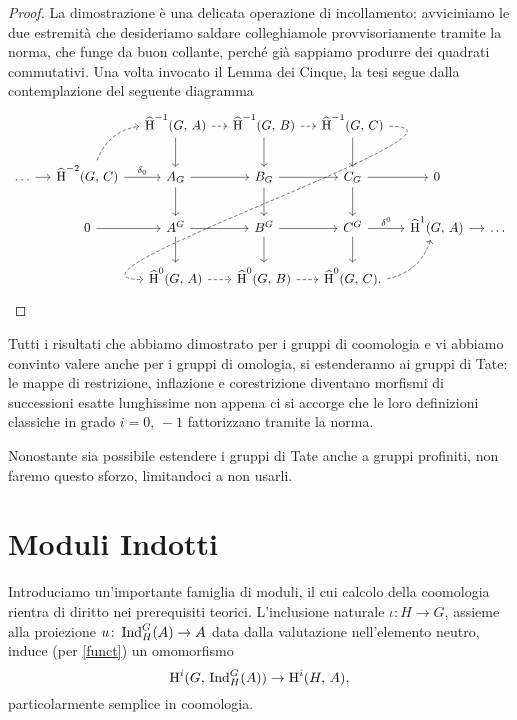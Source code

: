 \begin{proof}
	La dimostrazione è una delicata operazione di incollamento: avviciniamo le due estremità che desideriamo saldare colleghiamole provvisoriamente tramite la norma, che funge da buon collante, perché già sappiamo produrre dei quadrati commutativi. Una volta invocato il Lemma dei Cinque, la tesi segue dalla contemplazione del seguente diagramma
	\[\begin{tikzcd}[column sep = small]
	&& \Hhh^{-1}(G, \, A) \dar \rar[dashed]
	& \Hhh^{-1}(G, \, B) \dar \rar[dashed]
	& \Hhh^{-1}(G, \, C) \dar \ar[out=0, in=180, looseness=1, dashed]{dddll} %
	&& \\
	\dots \rar
	& \Hhh^{-2}(G, \, C) \rar["\delta_0"] \arrow[ur, dashed, bend left = 30]
	& A_G \rar \dar 
	& B_G \rar \arrow[d]
	& C_G \rar \dar
	& 0 & \\
	& 0 \rar
	&A^G \rar\dar
	& B^G \rar\dar
	& C^G \rar["\delta^0"]\dar
	& \Hhh^1(G, \, A) \rar
	& \dots \\
	&& \Hhh^{0}(G, \, A) \rar[dashed]
	& \Hhh^{0}(G, \, B)  \rar[dashed]
	& \Hhh^{0}(G, \, C). \arrow[ur, dashed, bend right = 30]
	&& \qedhere
	\end{tikzcd}\]
\end{proof}

Tutti i risultati che abbiamo dimostrato per i gruppi di coomologia e vi abbiamo convinto valere anche per i gruppi di omologia, si estenderanno ai gruppi di Tate: le mappe di restrizione, inflazione e corestrizione diventano morfismi di successioni esatte lunghissime non appena ci si accorge che le loro definizioni classiche in grado $ i = 0,\, -1 $ fattorizzano tramite la norma.\\

\begin{profinite}
	Nonostante sia possibile estendere i gruppi di Tate anche a gruppi profiniti, non faremo questo sforzo, limitandoci a non usarli.
\end{profinite}

\section{Moduli Indotti}
Introduciamo un'importante famiglia di moduli, il cui calcolo della coomologia rientra di diritto nei prerequisiti teorici. L'inclusione naturale $ \iota \colon H \to G $, assieme alla proiezione $ u \colon \operatorname{Ind}_H^G(A) \to A $ data dalla valutazione nell'elemento neutro, induce (per \ref{funct}) un omomorfismo \[ \operatorname{H}^i(G, \, \operatorname{Ind}_H^G(A)) \to \operatorname{H}^i(H, \, A), \]
particolarmente semplice in coomologia.

